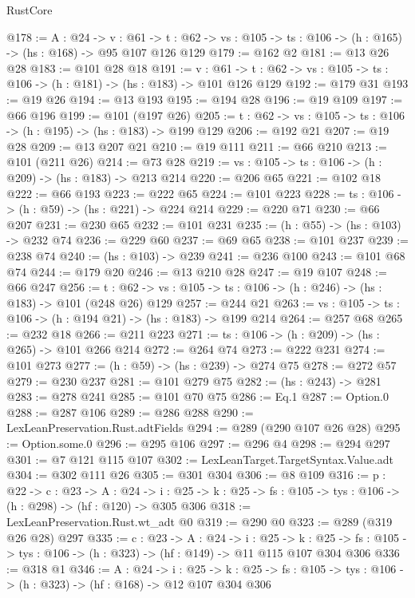 \begin{lexlean}{RustCore}
\begin{coremodule}
@178 := {A : @24} ->
  {v : @61} ->
  {t : @62} -> {vs : @105} -> {ts : @106} -> (h : @165) -> (hs : @168) -> @95 @107 @126 @129
@179 := @162 @2
@181 := @13 @26 @28
@183 := @101 @28 @18
@191 := {v : @61} ->
  {t : @62} -> {vs : @105} -> {ts : @106} -> (h : @181) -> (hs : @183) -> @101 @126 @129
@192 := @179 @31
@193 := @19 @26
@194 := @13 @193
@195 := @194 @28
@196 := @19 @109
@197 := @66 @196
@199 := @101 (@197 @26)
@205 := {t : @62} -> {vs : @105} -> {ts : @106} -> (h : @195) -> (hs : @183) -> @199 @129
@206 := @192 @21
@207 := @19 @28
@209 := @13 @207 @21
@210 := @19 @111
@211 := @66 @210
@213 := @101 (@211 @26)
@214 := @73 @28
@219 := {vs : @105} -> {ts : @106} -> (h : @209) -> (hs : @183) -> @213 @214
@220 := @206 @65
@221 := @102 @18
@222 := @66 @193
@223 := @222 @65
@224 := @101 @223
@228 := {ts : @106} -> (h : @59) -> (hs : @221) -> @224 @214
@229 := @220 @71
@230 := @66 @207
@231 := @230 @65
@232 := @101 @231
@235 := (h : @55) -> (hs : @103) -> @232 @74
@236 := @229 @60
@237 := @69 @65
@238 := @101 @237
@239 := @238 @74
@240 := (hs : @103) -> @239
@241 := @236 @100
@243 := @101 @68 @74
@244 := @179 @20
@246 := @13 @210 @28
@247 := @19 @107
@248 := @66 @247
@256 := {t : @62} -> {vs : @105} -> {ts : @106} -> (h : @246) -> (hs : @183) -> @101 (@248 @26) @129
@257 := @244 @21
@263 := {vs : @105} -> {ts : @106} -> (h : @194 @21) -> (hs : @183) -> @199 @214
@264 := @257 @68
@265 := @232 @18
@266 := @211 @223
@271 := {ts : @106} -> (h : @209) -> (hs : @265) -> @101 @266 @214
@272 := @264 @74
@273 := @222 @231
@274 := @101 @273
@277 := (h : @59) -> (hs : @239) -> @274 @75
@278 := @272 @57
@279 := @230 @237
@281 := @101 @279 @75
@282 := (hs : @243) -> @281
@283 := @278 @241
@285 := @101 @70 @75
@286 := Eq.{1}
@287 := Option.{0}
@288 := @287 @106
@289 := @286 @288
@290 := LexLeanPreservation.Rust.adtFields
@294 := @289 (@290 @107 @26 @28)
@295 := Option.some.{0}
@296 := @295 @106
@297 := @296 @4
@298 := @294 @297
@301 := @7 @121 @115 @107
@302 := LexLeanTarget.TargetSyntax.Value.adt
@304 := @302 @111 @26
@305 := @301 @304
@306 := @8 @109
@316 := {p : @22} ->
  {c : @23} ->
  {A : @24} ->
  {i : @25} -> {k : @25} -> {fs : @105} -> {tys : @106} -> (h : @298) -> (hf : @120) -> @305 @306
@318 := LexLeanPreservation.Rust.wt_adt @0
@319 := @290 @0
@323 := @289 (@319 @26 @28) @297
@335 := {c : @23} ->
  {A : @24} ->
  {i : @25} ->
  {k : @25} -> {fs : @105} -> {tys : @106} -> (h : @323) -> (hf : @149) -> @11 @115 @107 @304 @306
@336 := @318 @1
@346 := {A : @24} ->
  {i : @25} ->
  {k : @25} -> {fs : @105} -> {tys : @106} -> (h : @323) -> (hf : @168) -> @12 @107 @304 @306

\end{coremodule}
\end{lexlean}
